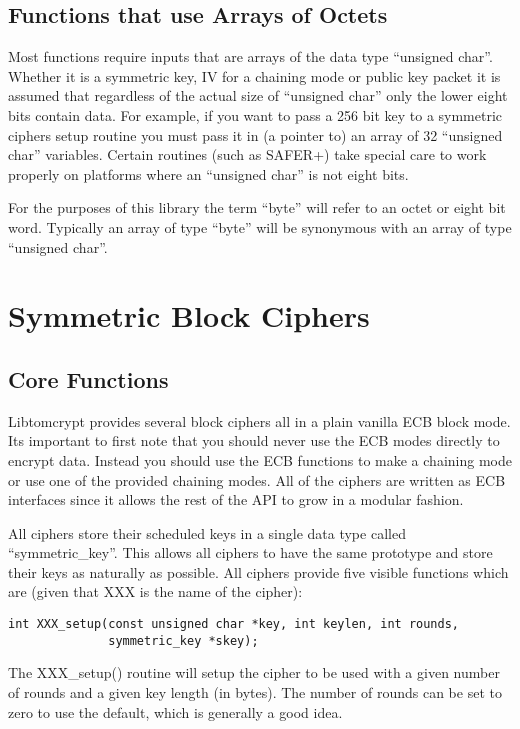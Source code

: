 \documentclass{book}
\begin{document}
\section{Functions that use Arrays of Octets}
Most functions require inputs that are arrays of the data type ``unsigned char''.  Whether it is a symmetric key, IV
for a chaining mode or public key packet it is assumed that regardless of the actual size of ``unsigned char'' only the
lower eight bits contain data.  For example, if you want to pass a 256 bit key to a symmetric ciphers setup routine
you must pass it in (a pointer to) an array of 32 ``unsigned char'' variables.  Certain routines 
(such as SAFER+) take special care to work properly on platforms where an ``unsigned char'' is not eight bits.

For the purposes of this library the term ``byte'' will refer to an octet or eight bit word.  Typically an array of
type ``byte'' will be synonymous with an array of type ``unsigned char''.

\chapter{Symmetric Block Ciphers}
\section{Core Functions}

Libtomcrypt provides several block ciphers all in a plain vanilla ECB block mode.  Its important to first note that you 
should never use the ECB modes directly to encrypt data.  Instead you should use the ECB functions to make a chaining mode
or use one of the provided chaining modes.  All of the ciphers are written as ECB interfaces since it allows the rest of
the API to grow in a modular fashion.

All ciphers store their scheduled keys in a single data type called ``symmetric\_key''.  This allows all ciphers to 
have the same prototype and store their keys as  naturally as possible.  All ciphers provide five visible functions which
are (given that XXX is the name of the cipher):
\begin{verbatim}
int XXX_setup(const unsigned char *key, int keylen, int rounds, 
              symmetric_key *skey);
\end{verbatim}

The XXX\_setup() routine will setup the cipher to be used with a given number of rounds and a given key length (in bytes).
The number of rounds can be set to zero to use the default, which is generally a good idea.
\end{document}
